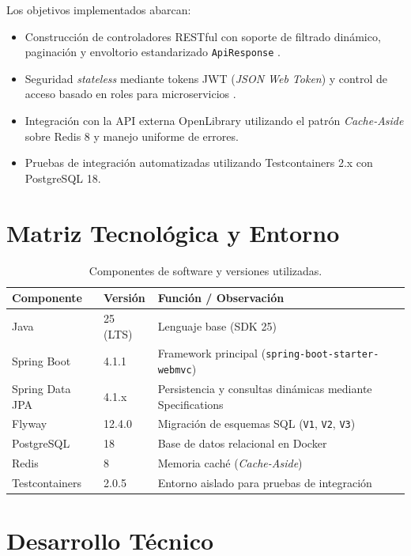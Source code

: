 \documentclass[11pt,a4paper]{article}
\begin{document}
Los objetivos implementados abarcan:
\begin{itemize}[noitemsep]
    \item Construcción de controladores RESTful con soporte de filtrado dinámico, paginación y envoltorio estandarizado \texttt{ApiResponse} \cite{pautasso2008restful}.
    \item Seguridad \textit{stateless} mediante tokens JWT (\textit{JSON Web Token}) y control de acceso basado en roles para microservicios \cite{taibi2020architectural}.
    \item Integración con la API externa OpenLibrary utilizando el patrón \textit{Cache-Aside} sobre Redis 8 y manejo uniforme de errores.
    \item Pruebas de integración automatizadas utilizando Testcontainers 2.x con PostgreSQL 18.
\end{itemize}

\section{Matriz Tecnológica y Entorno}

\begin{table}[H]
\centering
\caption{Componentes de software y versiones utilizadas.}
\begin{tabular}{lll}
\toprule
\textbf{Componente} & \textbf{Versión} & \textbf{Función / Observación} \\
\midrule
Java & 25 (LTS) & Lenguaje base (SDK 25) \\
Spring Boot & 4.1.1 & Framework principal (\texttt{spring-boot-starter-webmvc}) \\
Spring Data JPA & 4.1.x & Persistencia y consultas dinámicas mediante Specifications \\
Flyway & 12.4.0 & Migración de esquemas SQL (\texttt{V1}, \texttt{V2}, \texttt{V3}) \\
PostgreSQL & 18 & Base de datos relacional en Docker \\
Redis & 8 & Memoria caché (\textit{Cache-Aside}) \\
Testcontainers & 2.0.5 & Entorno aislado para pruebas de integración \\
\bottomrule
\end{tabular}
\end{table}

\section{Desarrollo Técnico}
\end{document}
